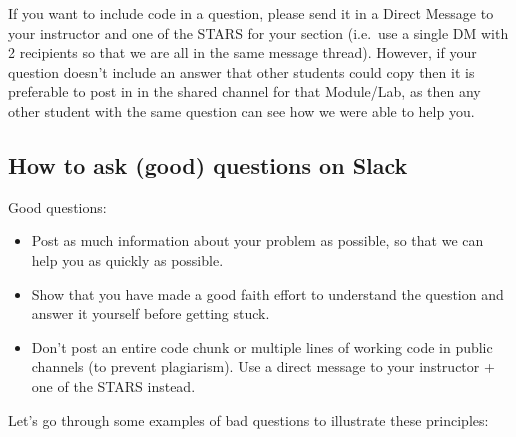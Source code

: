 \documentclass[
]{book}
\providecommand{\tightlist}{%
  \setlength{\itemsep}{0pt}\setlength{\parskip}{0pt}}
\begin{document}
If you want to include code in a question, please send it in a Direct Message to your instructor and one of the STARS for your section (i.e.~use a single DM with 2 recipients so that we are all in the same message thread). However, if your question doesn't include an answer that other students could copy then it is preferable to post in in the shared channel for that Module/Lab, as then any other student with the same question can see how we were able to help you.

\hypertarget{asking-questions}{%
\subsection{How to ask (good) questions on Slack}\label{asking-questions}}

Good questions:

\begin{itemize}
\tightlist
\item
  Post as much information about your problem as possible, so that we can help you as quickly as possible.
\item
  Show that you have made a good faith effort to understand the question and answer it yourself before getting stuck.
\item
  Don't post an entire code chunk or multiple lines of working code in public channels (to prevent plagiarism). Use a direct message to your instructor + one of the STARS instead.
\end{itemize}

Let's go through some examples of bad questions to illustrate these principles:
\end{document}
